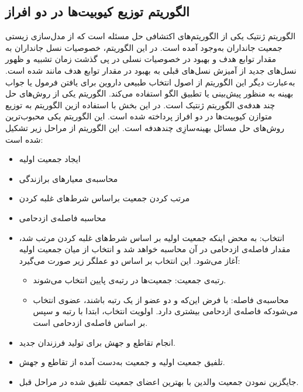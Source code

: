  
\subsection{الگوریتم توزیع کیوبیت‌ها در دو افراز}
الگوریتم ژنتیک یکی از الگوریتم‌های اکتشافی حل مسئله است که از مدل‌سازی زیستی جمعیت جانداران به‌وجود آمده است. در این الگوریتم، خصوصیات نسل جانداران به مقدار توابع هدف و بهبود در خصوصیات نسلی در پی گذشت زمان تشبیه و ظهور نسل‌های جدید از آمیزش نسل‌های قبلی به بهبود در مقدار توابع هدف مانند شده است. به‌عبارت دیگر این الگوریتم از اصول انتخاب طبیعی داروین برای یافتن فرمول یا جواب بهینه به منظور پیش‌بینی یا تطبیق الگو استفاده می‌کند. الگوریتم   یکی از روش‌های حل چند هدفه‌ی الگوریتم ژنتیک است. در این بخش با استفاده ازین الگوریتم به توزیع متوازن کیوبیت‌ها در دو افراز پرداخته شده است. این الگوریتم یکی محبوب‌ترین روش‌های حل مسائل بهینه‌سازِی چندهدفه است. این الگوریتم از مراحل زیر تشکیل شده است:
\begin{itemize}
\item
ایجاد جمعیت اولیه
\item
محاسبه‌ی معیارهای برازندگی
\item
مرتب کردن جمعیت براساس شرط‌های غلبه کردن
\item
محاسبه فاصله‌ی ازدحامی
\item
انتخاب: به محض اینکه جمعیت اولیه بر اساس شرط‌های غلبه کردن مرتب شد، مقدار فاصله‌ی ازدحامی در آن محاسبه خواهد شد و انتخاب از میان جمعیت اولیه آغاز می‌شود. این انتخاب بر اساس دو عملگر  زیر صورت می‌گیرد:
\begin{itemize}
\item
رتبه‌ی جمعیت: جمعیت‌ها در رتبه‌ی پایین انتخاب می‌شوند.
\item
محاسبه‌ی فاصله:
با فرض این‌که  و  دو عضو از یک رتبه باشند، عضوی انتخاب می‌شودکه فاصله‌ی ازدحامی بیشتری دارد. اولویت انتخاب، ابتدا با رتبه و سپس بر اساس فاصله‌ی ازدحامی است.
\end{itemize}
\item
انجام تقاطع  و جهش  برای تولید فرزندان جدید.
\item
تلفیق جمعیت اولیه و جمعیت به‌دست آمده از تقاطع و جهش.
\item
جایگزین نمودن جمعیت والدین با بهترین اعضای جمعیت تلفیق شده در مراحل قبل. 
\end{itemize}
